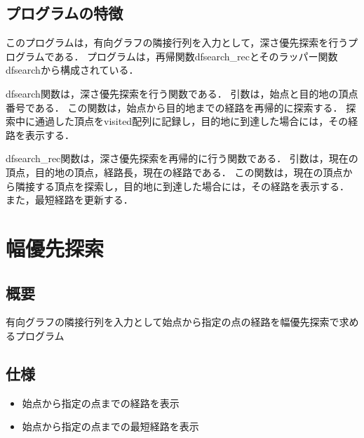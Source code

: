 \documentclass{ltjsarticle}
\begin{document}
\subsection{プログラムの特徴}
このプログラムは，有向グラフの隣接行列を入力として，深さ優先探索を行うプログラムである．
プログラムは，再帰関数dfsearch\_recとそのラッパー関数dfsearchから構成されている．

dfsearch関数は，深さ優先探索を行う関数である．
引数は，始点と目的地の頂点番号である．
この関数は，始点から目的地までの経路を再帰的に探索する．
探索中に通過した頂点をvisited配列に記録し，目的地に到達した場合には，その経路を表示する．

dfsearch\_rec関数は，深さ優先探索を再帰的に行う関数である．
引数は，現在の頂点，目的地の頂点，経路長，現在の経路である．
この関数は，現在の頂点から隣接する頂点を探索し，目的地に到達した場合には，その経路を表示する．
また，最短経路を更新する．

\section{幅優先探索}
\subsection{概要}
有向グラフの隣接行列を入力として始点から指定の点の経路を幅優先探索で求めるプログラム

\subsection{仕様}
\begin{itemize}
    \item 始点から指定の点までの経路を表示
    \item 始点から指定の点までの最短経路を表示
\end{itemize}
\end{document}
